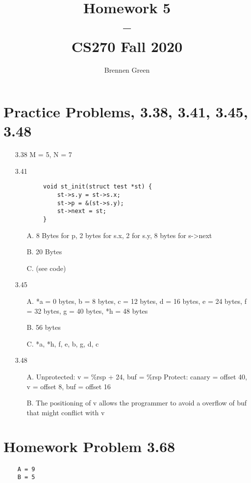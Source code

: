 \documentclass[11pt]{article}
\begin{document}
\title{Homework 5\\--\\\large CS270 Fall 2020}
\date{}
\author{Brennen Green}
\maketitle

\section{Practice Problems, 3.38, 3.41, 3.45, 3.48}
\begin{enumerate}
	\item[3.38] M = 5, N = 7
	\item[3.41]
	\begin{verbatim}
		void st_init(struct test *st) {
		    st->s.y = st->s.x;
		    st->p = &(st->s.y);
		    st->next = st;
		}
	\end{verbatim} 
	\begin{enumerate}
		\item[A.] 8 Bytes for p, 2 bytes for s.x, 2 for s.y, 8 bytes for s->next
		\item[B.] 20 Bytes
		\item[C.] (see code) 
	\end{enumerate} 
	\item[3.45]
	\begin{enumerate}
		\item[A.] *a = 0 bytes, b = 8 bytes, c = 12 bytes, d = 16 bytes, e = 24 bytes, f = 32 bytes,
		g = 40 bytes, *h = 48 bytes  
		\item[B.] 56 bytes
		\item[C.] *a, *h, f, e, b, g, d, c
	\end{enumerate}
	\item[3.48]
	\begin{enumerate}
		\item[A.] Unprotected: v = \%rsp + 24, buf = \%rsp Protect: canary = offset 40, v = offset 8, buf = offset 16
		\item[B.] The positioning of v allows the programmer to avoid a overflow of buf that might conflict with v
	\end{enumerate}
\end{enumerate}
\newpage
\section{Homework Problem 3.68}
\begin{verbatim}
	A = 9
	B = 5
\end{verbatim}
\end{document}
